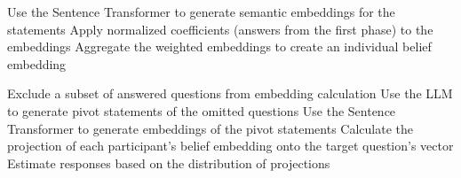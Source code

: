 \begin{algorithm}
\begin{algorithmic}[1]
\State

        \State Use the Sentence Transformer to generate semantic embeddings for the statements
        \State Apply normalized coefficients (answers from the first phase) to the embeddings
        \State Aggregate the weighted embeddings to create an individual belief embedding
    \EndFor
\EndProcedure

\State

    \State Exclude a subset of answered questions from embedding calculation
    \State Use the LLM to generate pivot statements of the omitted questions
    \State Use the Sentence Transformer to generate embeddings of the pivot statements
    \State Calculate the projection of each participant's belief embedding onto the target question's vector
    \State Estimate responses based on the distribution of projections
\EndProcedure

\State

\end{algorithmic}
\end{algorithm}

